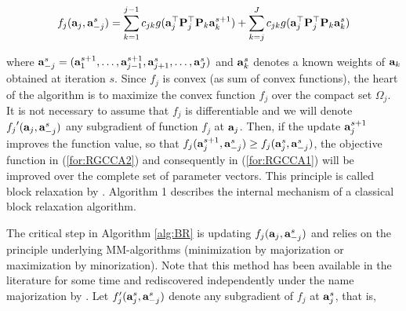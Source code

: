 \documentclass[
]{jss}
\begin{document}
\begin{equation}
  f_j(\mathbf{a}_j, \mathbf{a}_{-j}^s) = \sum_{k=1}^{j-1} 
c_{jk}g(\mathbf{a}_j^\top\mathbf{P}_j^\top\mathbf{P}_k\mathbf{a}_k^{s+1}) + \sum_{k=j}^{J} 
c_{jk}g(\mathbf{a}_j^\top\mathbf{P}_j^\top\mathbf{P}_k\mathbf{a}_k^{s}) 
    \label{RGCCA_fj}
\end{equation}

where
\(\mathbf{a}_{-j}^s = (\mathbf{a}_1^{s+1}, \ldots, \mathbf{a}_{j-1}^{s+1}, \mathbf{a}_{j+1}^s, \ldots, \mathbf{a}_J^s)\)
and \(\mathbf{a}_k^s\) denotes a known weights of \(\mathbf{a}_k\) obtained at
iteration \(s\). Since \(f_j\) is convex (as sum of convex functions),
the heart of the algorithm is to maximize the convex function \(f_j\)
over the compact set \(\Omega_j\). It is not necessary to assume that
\(f_j\) is differentiable and we will denote
\({f_j}'(\mathbf{a}_j, \mathbf{a}_{-j}^s)\) any subgradient of function \(f_j\)
at \(\mathbf{a}_j\). Then, if the update \(\mathbf{a}_j^{s+1}\) improves the
function value, so that
\(f_j(\mathbf{a}_j^{s+1}, \mathbf{a}_{-j}^s) \geq f_j(\mathbf{a}_j^s, \mathbf{a}_{-j}^s)\),
the objective function in (\ref{for:RGCCA2}) and consequently in
(\ref{for:RGCCA1}) will be improved over the complete set of parameter
vectors. This principle is called block relaxation by
\citep{DeLeeuw1994}. Algorithm 1 describes the internal mechanism of a
classical block relaxation algorithm.

The critical step in Algorithm \ref{alg:BR} is updating
\(f_j(\mathbf{a}_j, \mathbf{a}_{-j}^s)\) and relies on the principle underlying
MM-algorithms (minimization by majorization or maximization by
minorization). Note that this method has been available in the
literature for some time \citep{Voss1980} and rediscovered independently
under the name majorization by \citep{DeLeeuw77}. Let
\(f_j'(\mathbf{a}_j^s, \mathbf{a}_{-j}^s)\) denote any subgradient of \(f_j\) at
\(\mathbf{a}_j^s\), that is,
\end{document}
